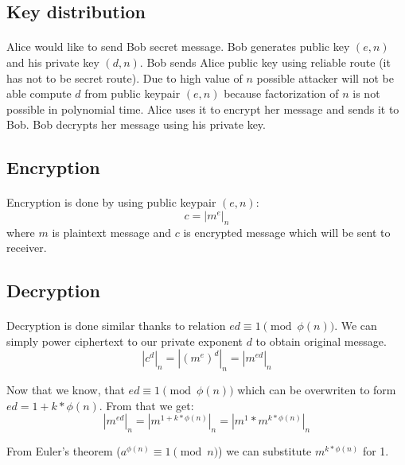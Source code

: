 \documentclass[thesis=B,english]{FITthesis}[2012/10/20]
\begin{document}
{\subsection{Key distribution}
\paragraph*{}
{Alice would like to send Bob secret message. Bob generates public key \((e,n)\) and his private key \((d,n)\). Bob sends Alice public key using reliable route (it has not to be secret route). Due to high value of \(n\) possible attacker will not be able compute \(d\) from public keypair \((e,n)\) because factorization of \(n\) is not possible in polynomial time. Alice uses it to encrypt her message and sends it to Bob. Bob decrypts her message using his private key.}

\subsection{Encryption}
\paragraph*{}
{Encryption is done by using public keypair \((e, n)\): \[c = | m^e | _n\]
where \(m\) is plaintext message and \(c\) is encrypted message which will be sent to receiver.
}

\subsection{Decryption}
\paragraph*{}
{Decryption is done similar thanks to relation \(ed \equiv 1 \pmod{\phi(n)}\). We can simply power ciphertext to our private exponent \(d\) to obtain original message.  
\[ |c^d|_n = |(m^e)^d|_n = | m^{ed}|_n \]

Now that we know, that \(ed \equiv 1 \pmod{\phi(n)}\) which can be overwriten to form \(ed = 1 + k*\phi(n)\). From that we get:
\[| m^{ed}|_n = | m^{1+ k*\phi(n) }|_n = | m^1 * m^{ k*\phi(n)}|_n\]

From Euler's theorem (\(a^{\phi(n)} \equiv 1 \pmod{n}\)) we can substitute \(m^{ k*\phi(n)}\) for 1.


}}
\end{document}

